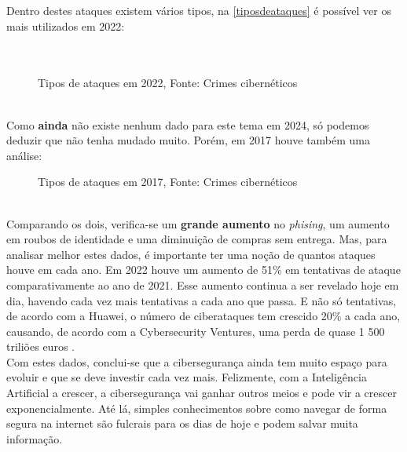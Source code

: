 \documentclass{report}
\begin{document}
Dentro destes ataques existem vários tipos, na \autoref{tiposdeataques} é possível ver os mais utilizados em 2022: \\
\\
\\
\begin{figure}[h!]
    \caption{Tipos de ataques em 2022, Fonte: Crimes cibernéticos \cite{estatistica}}
    \label{tiposdeataques}
\end{figure} \\

Como \textbf{ainda} não existe nenhum dado para este tema em 2024, só podemos deduzir que não tenha mudado muito. Porém, em 2017 houve também uma análise: \\
\begin{figure}[h!]
    \caption{Tipos de ataques em 2017, Fonte: Crimes cibernéticos \cite{estatistica}}
    \label{tiposdeataques2}
\end{figure} \\
Comparando os dois, verifica-se um \textbf{grande aumento} no \textit{phising}, um aumento em roubos de identidade e uma diminuição de compras sem entrega. Mas, para analisar melhor estes dados, é importante ter uma noção de quantos ataques houve em cada ano. Em 2022 houve um aumento de 51\% em tentativas de ataque comparativamente ao ano de 2021. Esse aumento continua a ser revelado hoje em dia, havendo cada vez mais tentativas a cada ano que passa. E não só tentativas, de acordo com a Huawei, o número de ciberataques tem crescido 20\% a cada ano, causando, de acordo com a Cybersecurity Ventures, uma perda de quase 1 500 triliões euros \cite{exame}.
\\ \indent Com estes dados, conclui-se que a cibersegurança ainda tem muito espaço para evoluir e que se deve investir cada vez mais. Felizmente, com a Inteligência Artificial a crescer, a cibersegurança vai ganhar outros meios e pode vir a crescer exponencialmente. Até lá, simples conhecimentos sobre como navegar de forma segura na internet são fulcrais para os dias de hoje e podem salvar muita informação.
\end{document}
